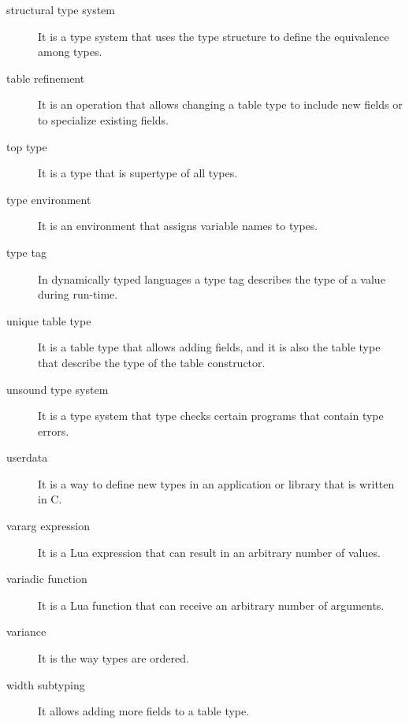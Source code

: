 \begin{description}
\item[structural type system] It is a type system that uses the type structure to define the equivalence among types.

\item[table refinement] It is an operation that allows changing a table type to include new fields or
to specialize existing fields.

\item[top type] It is a type that is supertype of all types.

\item[type environment] It is an environment that assigns variable names to types.

\item[type tag] In dynamically typed languages a type tag describes the type of a value during
run-time.

\item[unique table type] It is a table type that allows adding fields, and it is also the table type
that describe the type of the table constructor.

\item[unsound type system] It is a type system that type checks certain programs that contain type errors.

\item[userdata] It is a way to define new types in an application or library that is written in C.

\item[vararg expression] It is a Lua expression that can result in an arbitrary number of values.

\item[variadic function] It is a Lua function that can receive an arbitrary number of arguments.

\item[variance] It is the way types are ordered.

\item[width subtyping] It allows adding more fields to a table type.

\end{description}
